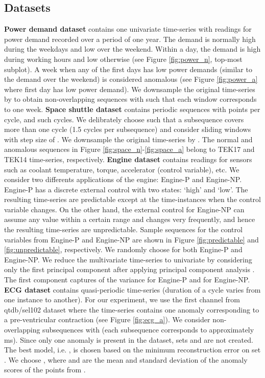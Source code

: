 \documentclass{article}
\begin{document}
\subsection{Datasets}
\textbf{Power demand dataset}
contains one univariate time-series with  readings for power demand recorded over a period of one year. The demand is normally high during the weekdays and low over the weekend. Within a day, the demand is high during working hours and low otherwise (see Figure \ref{fig:power_n}, top-most subplot). A week when any of the first  days has low power demands (similar to the demand over the weekend) is considered anomalous (see Figure \ref{fig:power_a} where first day has low power demand).
We downsample the original time-series by  to obtain non-overlapping sequences with  such that each window corresponds to one week. 
\newline
\textbf{Space shuttle dataset}
contains periodic sequences with  points per cycle, and  such cycles. We delibrately choose  such that a subsequence covers more than one cycle (1.5 cycles per subsequence) and consider sliding windows with step size of . We downsample the original time-series by . The normal and anomalous sequences in Figure \ref{fig:space_n}-\ref{fig:space_a} belong to TEK17 and TEK14 time-series, respectively. \newline
\textbf{Engine dataset}
contains readings for  sensors such as coolant temperature, torque, accelerator (control variable), etc. We consider two differents applications of the engine: Engine-P and Engine-NP. Engine-P has a discrete external control with two states: `high' and `low'. The resulting time-series are predictable except at the time-instances when the control variable changes. On the other hand, the external control for Engine-NP can assume any value within a certain range and changes very frequently, and hence the resulting time-series are unpredictable. Sample sequences for the control variables from Engine-P and Engine-NP are shown in Figure \ref{fig:predictable} and \ref{fig:unpredictable}, respectively.
We randomly choose  for both Engine-P and Engine-NP.
We reduce the multivariate time-series to univariate by considering only the first principal component after applying principal component analysis \cite{book:pca}. The first component captures  of the variance for Engine-P and  for Engine-NP.
\newline
\textbf{ECG dataset}
contains quasi-periodic time-series (duration of a cycle varies from one instance to another).
For our experiment, we use the first channel from qtdb/sel102 dataset where the time-series contains one anomaly corresponding to a pre-ventricular contraction (see Figure \ref{fig:ecg_a}). We consider non-overlapping subsequences with  (each subsequence corresponds to approximately ms). Since only one anomaly is present in the dataset, sets  and  are not created. The best model, i.e. , is chosen based on the minimum reconstruction error on set . We choose , where  and  are the mean and standard deviation of the anomaly scores of the points from .
\end{document}
